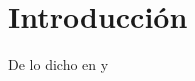 \chapter{Introducci\'on}\label{ch:introduccion}

De lo dicho en \cite{krizhevsky:2012} y \cite{lee:2016}

\smallskip
